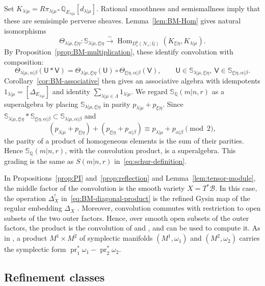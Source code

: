 \documentclass[11pt,a4paper]{amsart}
\theoremstyle{definition}
\theoremstyle{remark}
\newcommand{\Q}{\mathbb Q}
\newcommand{\N}{\mathcal N}
\newcommand{\B}{\mathcal B}
\newcommand{\bS}{\mathbb S}
\newcommand{\Hom}{\operatorname{Hom}}
\newcommand{\pr}{\operatorname{pr}}
\newcommand{\lm}{\lambda|\mu}
\newcommand{\xh}{\xi|\eta}
\newcommand{\ab}{\alpha|\beta}
\numberwithin{equation}{section}
\begin{document}
Set $K_{\lm}=R\pi_{\lm*}\Q_{E_{\lm}}[d_{\lm}]$.
Rational smoothness and semismallness imply that these are
semisimple perverse sheaves. Lemma~\ref{lem:BM-Hom} gives natural
isomorphisms
\begin{equation}\label{eq:BM-Hom-summary}
\Theta_{\lm,\xh}:\bS_{\lm,\xh}
\xrightarrow{\sim}\Hom_{D_c^b(\N_r;\Q)}(K_{\xh},K_{\lm}).
\end{equation}
By Proposition~\ref{prop:BM-multiplication}, these identify
convolution with composition:
$$
\Theta_{\lm,\ab}(\mathsf U*\mathsf V)
=\Theta_{\lm,\xh}(\mathsf U)\circ\Theta_{\xh,\ab}(\mathsf V),
\qquad \mathsf U\in\bS_{\lm,\xh},\ \mathsf V\in\bS_{\xh,\ab}.
$$
Corollary~\ref{cor:BM-associative}
then gives an associative algebra with idempotents
$1_{\lm}=[\Delta_{E_{\lm}}]$ and identity
$\sum_{\lm\in\Lambda}1_{\lm}$.
We regard $\bS_\Q(m|n,r)$ as a superalgebra by placing $\bS_{\lm,\xh}$
in parity $p_{\lm}+p_{\xh}$. Since
$\bS_{\lm,\xh}*\bS_{\xh,\ab}\subset\bS_{\lm,\ab}$ and
$$
(p_{\lm}+p_{\xh})+(p_{\xh}+p_{\ab})\equiv p_{\lm}+p_{\ab}\pmod2,
$$
the parity of a product of homogeneous elements is the sum of their
parities. Hence $\bS_\Q(m|n,r)$, with the convolution product, is a superalgebra. This grading is the same as
$S(m|n,r)$ in~\eqref{eq:schur-definition}.

In Propositions~\ref{prop:PI} and~\ref{prop:reflection} and
Lemma~\ref{lem:tensor-module}, the middle factor of the convolution is the
smooth variety $X=T^*\B$. In this case, the operation $\Delta_X^!$
in~\eqref{eq:BM-diagonal-product} is the refined Gysin map of the
regular embedding $\Delta_X$ \cite[Section~2.6]{CG}. Moreover,
convolution commutes with restriction to open subsets of the two outer
factors. Hence, over smooth open subsets of the outer factors, the
product is the convolution of \cite[Section~2.7]{CG} and
\cite[Section~8.i]{Nak}, and \cite[Lemma~8.5]{Nak} can be used to
compute it. As in \cite[Section~5]{Nak}, a product $M^1\times M^2$ of
symplectic manifolds $(M^1,\omega_1)$ and $(M^2,\omega_2)$ carries the
symplectic form $\pr_1^*\omega_1-\pr_2^*\omega_2$.

\subsection{Refinement classes}
\label{sec:refinement}
\end{document}
